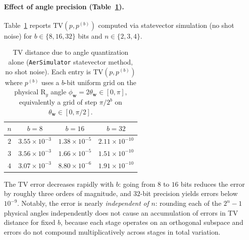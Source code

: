 \documentclass{article}
\newcommand{\RY}{\mathrm{R}_y}
\numberwithin{equation}{section}
\begin{document}
\paragraph{Effect of angle precision (Table~\ref{tab:tv_angles}).}
Table~\ref{tab:tv_angles} reports $\mathrm{TV}(p, p^{(b)})$ computed via statevector simulation
(no shot noise) for $b\in\{8,16,32\}$ bits and $n\in\{2,3,4\}$.
\begin{table}[h]
\centering
\begin{tabular}{c|ccc}
$n$ & $b=8$ & $b=16$ & $b=32$ \\
\hline
$2$ & $3.55\times10^{-3}$ & $1.38\times10^{-5}$ & $2.11\times10^{-10}$ \\
$3$ & $3.56\times10^{-3}$ & $1.66\times10^{-5}$ & $1.51\times10^{-10}$ \\
$4$ & $3.07\times10^{-3}$ & $8.80\times10^{-6}$ & $1.91\times10^{-10}$ \\
\end{tabular}
\caption{TV distance due to angle quantization alone
(\texttt{AerSimulator} statevector method, no shot noise).
Each entry is $\mathrm{TV}(p, p^{(b)})$ where $p^{(b)}$ uses a $b$-bit
uniform grid on the physical $\RY$ angle $\phi_{\mathbf{w}}=2\theta_{\mathbf{w}}\in[0,\pi]$,
equivalently a grid of step $\pi/2^b$ on $\theta_{\mathbf{w}}\in[0,\pi/2]$.}
\label{tab:tv_angles}
\end{table}
The TV error decreases rapidly with $b$: going from $8$ to $16$ bits reduces the error by
roughly three orders of magnitude, and $32$-bit precision yields errors below $10^{-9}$.
Notably, the error is nearly \emph{independent of $n$}: rounding each of the $2^n-1$
physical angles independently does not cause an accumulation of errors in TV distance
for fixed $b$, because each stage operates on an orthogonal subspace and errors do not
compound multiplicatively across stages in total variation.
\end{document}
